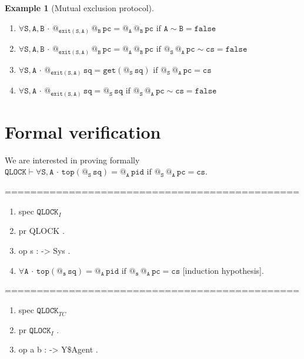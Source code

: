 \documentclass{article}
\makeatletter
\newcommand{\B}{\mathtt{B}}
\newcommand{\A}{\mathtt{A}}
\renewcommand{\S}{\mathtt{S}}
\newcommand{\s}{{\mathtt{s}}}
\newcommand{\pc}{{\mathtt{pc}}}
\newcommand{\pid}{{\mathtt{pid}}}
\newcommand{\sq}{{\mathtt{sq}}}
\newcommand{\cs}{{\mathtt{cs}}}
\newcommand{\QLOCK}{{\mathtt{QLOCK}}}
\newcommand{\Top}{{\mathtt{top}}}
\newcommand{\false}{{\mathtt{false}}}
\newcommand{\exit}{{\mathtt{exit}}}
\newcommand{\get}{{\mathtt{get}}}
\newcommand{\at}[1]{@_{#1}\,}
\newcommand{\Forall}[1]{\forall #1\,{\cdot}\,}
\newtheorem{example}{Example}
\newcounter{nr}
\makeatother
\begin{document}
\begin{example} [Mutual exclusion protocol]
\begin{enumerate}[label=(\arabic*),ref=\arabic*, leftmargin=*]
 \item \label{sen-16}$\Forall{\S, \A,\B}  \at{\exit(\S,\A) }\at{\B}\pc =  \at{\A }\at{\B}\pc \text{ if } \A \sim \B =\false$
 
 \item \label{sen-17}$\Forall{\S, \A,\B}  \at{\exit(\S,\A) }\at{\B}\pc =  \at{\A }\at{\B}\pc \text{ if } \at{\S} \at{\A} \pc \sim \cs = \false $
 
 \item \label{sen-18}$\Forall{\S,\A} \at{\exit(\S,\A)}\sq = \get (\at{\S}\sq) \text{ if } \at{\S}\at{\A} \pc = \cs$
 
  \item \label{sen-19}$\Forall{\S,\A} \at{\exit(\S,\A)}\sq = \at{\S}\sq \text{ if } \at{\S}\at{\A} \pc \sim \cs =\false$
  \setcounter{nr}{\value{enumi}}
 \end{enumerate}
 
 \end{example}

\section{Formal verification}

We are interested in proving formally 
 $\QLOCK\vdash\Forall{\S,\A}\Top(\at{\S}\sq)=\at{\A}\pid\text{ if } \at{\S}\at{\A}\pc=\cs$.
 
 ==============================================
   \begin{enumerate}[label=(\arabic*),ref=\arabic*,leftmargin=*] \tt
   \setcounter{enumi}{\value{nr}}
   \item [] spec $\QLOCK_I$
   
   \item [] pr QLOCK .
   
   \item [] op s : -> Sys .
   
   \setcounter{enumi}{\value{nr}}
   \item  $\Forall{\A}\Top(\at{\s}\sq)=\at{\A}\pid\text{ if } \at{\s}\at{\A}\pc=\cs$ [induction hypothesis].
   \setcounter{nr}{\value{enumi}}
   \end{enumerate}
  
  ==============================================
  \begin{enumerate}[label=(\arabic*),ref=\arabic*,leftmargin=*] \tt
   \setcounter{enumi}{\value{nr}} 
   
    \item[] spec $\QLOCK_{TC}$
    
    \item[] pr $\QLOCK_I$ .
    
    \item[] op a b : -> Y\$Agent . 
    
   \end{enumerate}
   
\end{document}
